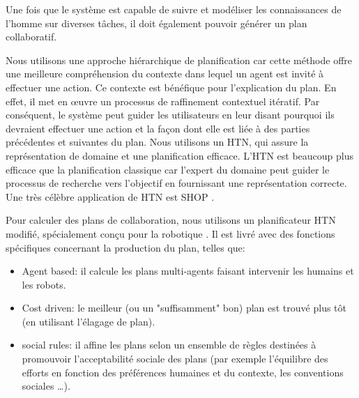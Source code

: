 \documentclass[a4paper,11pt,twoside]{StyleThese}
\begin{document}


Une fois que le système est capable de suivre et modéliser les connaissances de l'homme sur diverses tâches, il doit également pouvoir générer un plan collaboratif.

Nous utilisons une approche hiérarchique de planification car cette méthode offre une meilleure compréhension du contexte dans lequel un agent est invité à effectuer une action. Ce contexte est bénéfique pour l'explication du plan. En effet, il met en œuvre un processus de raffinement contextuel itératif. Par conséquent, le système peut guider les utilisateurs en leur disant pourquoi ils devraient effectuer une action et la façon dont elle est liée à des parties précédentes et suivantes du plan.
Nous utilisons un HTN, qui assure la représentation de domaine et une planification efficace.
L'HTN est beaucoup plus efficace que la planification classique car l'expert du domaine peut guider le processus de recherche vers l'objectif en fournissant une représentation correcte.
Une très célèbre application de HTN est SHOP \cite{Nau99}.

Pour calculer des plans de collaboration, nous utilisons un planificateur HTN modifié, spécialement conçu pour la robotique \cite{lallement14}.
Il est livré avec des fonctions spécifiques concernant la production du plan, telles que:

\begin{itemize}
\item Agent based: il calcule les plans multi-agents faisant intervenir les humains et les robots.
\item Cost driven: le meilleur (ou un "suffisamment" bon) plan est trouvé plus tôt (en utilisant l'élagage de plan).
\item social rules: il affine les plans selon un ensemble de règles destinées à promouvoir l'acceptabilité sociale des plans (par exemple l'équilibre des efforts  en fonction des préférences humaines et du contexte, les conventions sociales \ldots).
\end{itemize}
\end{document}
